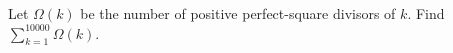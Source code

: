 Let $\Omega(k)$ be the number of positive perfect-square divisors of $k$. Find $\sum_{k=1}^{10000}\Omega(k)$.
